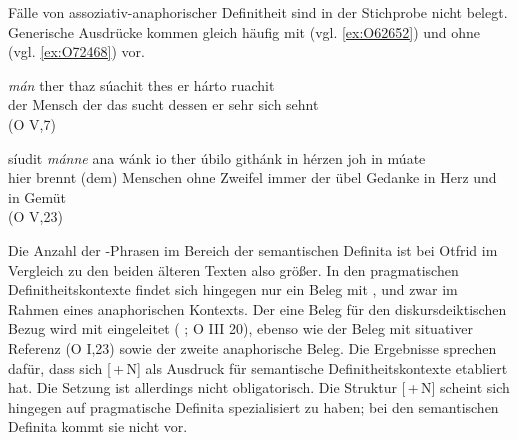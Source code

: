 
Fälle von assoziativ-anaphorischer  Definitheit sind in der Stichprobe nicht belegt. Generische Ausdrücke kommen gleich häufig mit (vgl. \ref{ex:O62652}) und ohne (vgl. \ref{ex:O72468})  vor.

%

\begin{exe}
\ex \label{ex:O62652}  {\textit{mán}} {ther} {thaz} {súachit} {thes} {er} {hárto} {ruachit} \\
{der} {Mensch} {der} {das} {sucht} {dessen} {er} {sehr} {sich sehnt} \\
\glt   {} (O V,7)
%

\ex \label{ex:O72468}  {síudit} {\textit{mánne}} {ana} {wánk} {io} {ther} {úbilo} {githánk} {in} {hérzen} {joh} {in} {múate}  \\
{hier} {brennt} {(dem) Menschen} {ohne} {Zweifel} {immer} {der} {übel} {Gedanke} {in} {Herz} {und} {in} {Gemüt} \\
\glt   {}  (O V,23)
\end{exe}

Die Anzahl der -Phrasen  im Bereich der semantischen Definita  ist bei Otfrid im Vergleich zu den beiden älteren Texten also größer. In den pragmatischen Definitheitskontexte  findet sich hingegen nur ein Beleg mit , und zwar im Rahmen eines anaphorischen  Kontexts. Der eine Beleg für den diskursdeiktischen  Bezug wird mit  eingeleitet ( ; O III 20), ebenso wie der Beleg mit situativer Referenz    (O I,23) sowie der zweite anaphorische  Beleg. Die Ergebnisse sprechen dafür, dass sich [\,+\,N] als Ausdruck für semantische Definitheitskontexte  etabliert hat. Die Setzung ist allerdings nicht obligatorisch. Die Struktur [\,+\,N] scheint sich hingegen auf pragmatische Definita  spezialisiert zu haben; bei den semantischen Definita  kommt sie nicht vor.

